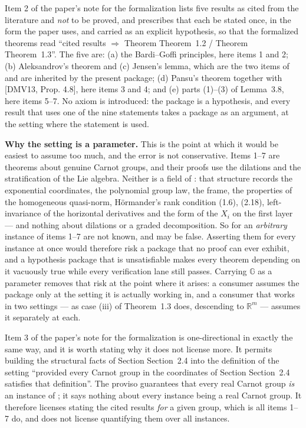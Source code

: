 \begin{definition}
Item 2 of the paper's note for the formalization lists five results as cited from the
literature and \emph{not} to be proved, and prescribes that each be stated once, in the form
the paper uses, and carried as an explicit hypothesis, so that the formalized theorems read
``cited results $\Rightarrow$ Theorem Theorem~1.2 / Theorem Theorem~1.3''. The five are: (a) the
Bardi--Goffi principles, here items 1 and 2; (b) Aleksandrov's theorem and (c) Jensen's
lemma, which are the two items of  and are inherited by the
present package; (d) Pansu's theorem together with [DMV13, Prop. 4.8], here items 3 and 4;
and (e) parts (1)--(3) of Lemma~3.8, here items 5--7. No axiom is introduced: the package is a
hypothesis, and every result that uses one of the nine statements takes a package as an
argument, at the setting where the statement is used.

\medskip\noindent\textbf{Why the setting is a parameter.} This is the point at which it would
be easiest to assume too much, and the error is not conservative. Items 1--7 are theorems
about genuine Carnot groups, and their proofs use the dilations and the stratification of the
Lie algebra. Neither is a field of : that structure records the
exponential coordinates, the polynomial group law, the frame, the properties of the
homogeneous quasi-norm, Hörmander's rank condition (1.6), (2.18), left-invariance of
the horizontal derivatives and the form of the $X_i$ on the first layer --- and nothing
about dilations or a graded decomposition. So for an \emph{arbitrary} instance of
 items 1--7 are not known, and may be false. Asserting them for every
instance at once would therefore risk a package that no proof can ever exhibit, and a
hypothesis package that is unsatisfiable makes every theorem depending on it vacuously true
while every verification lane still passes. Carrying $\mathbb G$ as a parameter removes that
risk at the point where it arises: a consumer assumes the package only at the setting it is
actually working in, and a consumer that works in two settings --- as case (iii) of
Theorem~1.3 does, descending to $\mathbb R^{m}$ --- assumes it separately at each.

Item 3 of the paper's note for the formalization is one-directional in exactly the same way,
and it is worth stating why it does not license more. It permits building the structural facts
of Section Section~2.4 into the definition of the setting ``provided every Carnot group in
the coordinates of Section Section~2.4 satisfies that definition''. The proviso guarantees
that every real Carnot group \emph{is} an instance of ; it says
nothing about every instance being a real Carnot group. It therefore licenses stating the
cited results \emph{for} a given group, which is all items 1--7 do, and does not license
quantifying them over all instances.


\end{definition}
